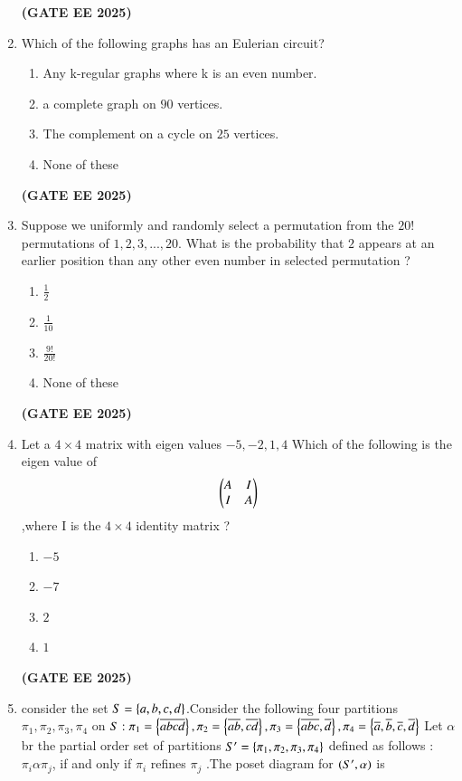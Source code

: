 \documentclass[journal,12pt,onecolumn]{IEEEtran}
\theoremstyle{remark}
\begin{document}
\begin{enumerate}
\begin{enumerate}
    \end{enumerate}
    \hfill \textbf{(GATE EE 2025)}
    \item Which of the following graphs has an Eulerian circuit?
    \begin{enumerate}
        \item Any k-regular graphs where k is an even number.
        \item a complete graph on $90$ vertices.
        \item The complement on a cycle on $25$ vertices.
        \item None of these
        \end{enumerate}
        \hfill \textbf{(GATE EE 2025)}
\item Suppose we uniformly and randomly select a permutation from the $20!$ permutations of $1,2,3,...,20.$ What is the probability that $2$ appears at an earlier position than any other even number  in selected permutation ?
\begin{enumerate}
    \item $\frac{1}{2}$   

    \item $\frac{1}{10}$

    \item $\frac{9!}{20!}$
  
    \item None of these
\end{enumerate}
\hfill \textbf{(GATE EE 2025)}
\item Let a $4 \times 4$ matrix with eigen values $-5,-2,1,4 $ Which of the following is the eigen value of
\begin{align}
    \begin{pmatrix}A & I\\ I & A\end{pmatrix}
\end{align} 
,where I is the $4 \times 4$ identity matrix ?
\begin{enumerate}
    \item $-5$
    \item $-7$
    \item $2$
    \item $1$
\end{enumerate}
    
    \hfill \textbf{(GATE EE 2025)}
     
    \item consider the set $S=\left\{a,b,c,d\right\}$.Consider the following four partitions $\pi_1,\pi_2,\pi_3,\pi_4$ on $S: \pi_1=\left\{\overline{abcd}\right\},\pi_2=\left\{\overline{ab},\overline{cd}\right\},\pi_3=\left\{\overline{abc},\overline{d}\right\},\pi_4=\left\{\overline{a},\overline{b},\overline{c},\overline{d}\right\}$ Let $\alpha$ br the partial  order set of partitions $S'=\left\{\pi_1,\pi_2,\pi_3,\pi_4\right\}$ defined as follows :$\pi_i \alpha \pi_j$, if and only if $\pi_i$ refines $\pi_j$ .The poset diagram for $\left(S',\alpha\right)$ is
   

\end{enumerate}
\end{document}
